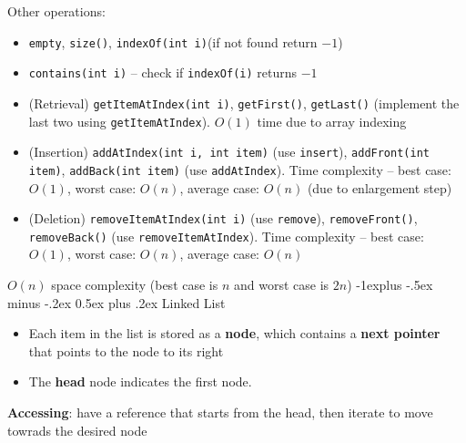 \documentclass[10pt,landscape,a4paper]{article}
\makeatletter
\renewcommand{\subsection}{\@startsection{subsection}{2}{0mm}%
                                {-1explus -.5ex minus -.2ex}%
                                {0.5ex plus .2ex}%
                                {\normalfont\normalsize\bfseries}}
\makeatother
\begin{document}
\begin{multicols}{4}
Other operations:
\begin{itemize}
	\item \texttt{empty}, \texttt{size()}, \texttt{indexOf(int i)}(if not found return $-1$)
	\item \texttt{contains(int i)} -- check if \texttt{indexOf(i)} returns  $-1$
	\item (Retrieval) \texttt{getItemAtIndex(int i)}, \texttt{getFirst()}, \texttt{getLast()} (implement the last two using \texttt{getItemAtIndex}). $O(1)$ time due to array indexing
	\item (Insertion) \texttt{addAtIndex(int i, int item)} (use \texttt{insert}), \texttt{addFront(int item)}, \texttt{addBack(int item)} (use \texttt{addAtIndex}). Time complexity -- best case: $O(1)$, worst case:  $O(n)$, average case:  $O(n)$ (due to enlargement step)
	\item (Deletion) \texttt{removeItemAtIndex(int i)} (use \texttt{remove}), \texttt{removeFront()}, \texttt{removeBack()} (use \texttt{removeItemAtIndex}). Time complexity -- best case: $O(1)$, worst case:  $O(n)$, average case:  $O(n)$
\end{itemize}
$O(n)$ space complexity (best case is  $n$ and worst case is  $2n$)
\subsection{Linked List}
\begin{itemize}
	\item Each item in the list is stored as a \textbf{node}, which contains a \textbf{next pointer} that points to the node to its right
	\item The \textbf{head} node indicates the first node.
\end{itemize}
\textbf{Accessing}: have a reference that starts from the head, then iterate to move towrads the desired node


\end{multicols}
\end{document}
